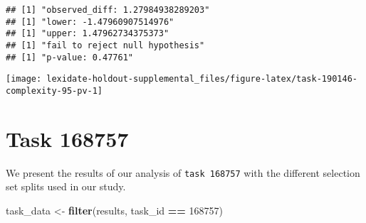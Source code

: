 \documentclass[
]{book}
\newenvironment{Shaded}{\begin{snugshade}}{\end{snugshade}}
\newcommand{\AttributeTok}[1]{\textcolor[rgb]{0.13,0.29,0.53}{#1}}
\newcommand{\DecValTok}[1]{\textcolor[rgb]{0.00,0.00,0.81}{#1}}
\newcommand{\FunctionTok}[1]{\textcolor[rgb]{0.13,0.29,0.53}{\textbf{#1}}}
\newcommand{\NormalTok}[1]{#1}
\newcommand{\OtherTok}[1]{\textcolor[rgb]{0.56,0.35,0.01}{#1}}
\newcommand{\SpecialCharTok}[1]{\textcolor[rgb]{0.81,0.36,0.00}{\textbf{#1}}}
\newcommand{\StringTok}[1]{\textcolor[rgb]{0.31,0.60,0.02}{#1}}
\begin{document}
\begin{Shaded}
\end{Shaded}

\begin{verbatim}
## [1] "observed_diff: 1.27984938289203"
## [1] "lower: -1.47960907514976"
## [1] "upper: 1.47962734375373"
## [1] "fail to reject null hypothesis"
## [1] "p-value: 0.47761"
\end{verbatim}

\texttt{[image: lexidate-holdout-supplemental\_files/figure-latex/task-190146-complexity-95-pv-1]}

\hypertarget{task-168757}{%
\chapter{Task 168757}\label{task-168757}}

We present the results of our analysis of \texttt{task\ 168757} with the different selection set splits used in our study.

\begin{Shaded}
\begin{Highlighting}[]
\NormalTok{task\_data }\OtherTok{\textless{}{-}} \FunctionTok{filter}\NormalTok{(results, task\_id }\SpecialCharTok{==} \DecValTok{168757}\NormalTok{)}
\end{Highlighting}
\end{Shaded}
\end{document}
